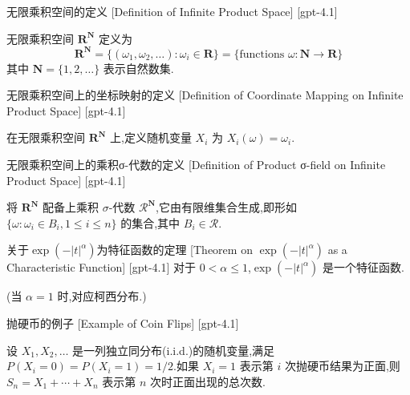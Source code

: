 \documentclass[UTF8]{ctexart}
\begin{document}
    
    
    \begin{dfn}
        {无限乘积空间的定义}
        [Definition of Infinite Product Space]
        [gpt-4.1]
        
无限乘积空间 $\mathbf{R}^{\mathbf{N}}$ 定义为
\[
\mathbf{R}^{\mathbf{N}} = \{ (\omega_1, \omega_2, \ldots) : \omega_i \in \mathbf{R} \} = \{ \text{functions } \omega : \mathbf{N} \to \mathbf{R} \}
\]
其中 $\mathbf{N} = \{ 1, 2, \ldots \}$ 表示自然数集.

    \end{dfn}
    
    
    
    \begin{dfn}
        {无限乘积空间上的坐标映射的定义}
        [Definition of Coordinate Mapping on Infinite Product Space]
        [gpt-4.1]
        
在无限乘积空间 $\mathbf{R}^{\mathbf{N}}$ 上,定义随机变量 $X_i$ 为 $X_i(\omega) = \omega_i$.

    \end{dfn}
    
    
    
    \begin{dfn}
        {无限乘积空间上的乘积σ-代数的定义}
        [Definition of Product σ-field on Infinite Product Space]
        [gpt-4.1]
        
将 $\mathbf{R}^{\mathbf{N}}$ 配备上乘积 $\sigma$-代数 $\mathcal{R}^{\mathbf{N}}$,它由有限维集合生成,即形如 $\{ \omega : \omega_i \in B_i, 1 \le i \le n \}$ 的集合,其中 $B_i \in \mathcal{R}$.

    \end{dfn}
    
    
    
    \begin{thm}
        {关于$\exp(-|t|^\alpha)$为特征函数的定理}
        [Theorem on $\exp(-|t|^\alpha)$ as a Characteristic Function]
        [gpt-4.1]
        对于 $0 < \alpha \leq 1$,$\exp(-|t|^\alpha)$ 是一个特征函数.

(当 $\alpha=1$ 时,对应柯西分布.)

    \end{thm}
    
    
    
    \begin{xmp}
        {抛硬币的例子}
        [Example of Coin Flips]
        [gpt-4.1]
        
设 $X_{1}, X_{2}, \dots$ 是一列独立同分布(i.i.d.)的随机变量,满足 $P(X_{i} = 0) = P(X_{i} = 1) = 1/2$.如果 $X_{i} = 1$ 表示第 $i$ 次抛硬币结果为正面,则 $S_{n} = X_{1} + \cdots + X_{n}$ 表示第 $n$ 次时正面出现的总次数.

    \end{xmp}
    
\end{document}
